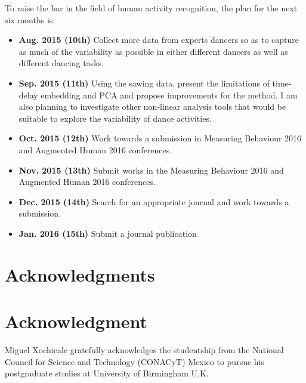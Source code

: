 \documentclass[10pt,journal,compsoc]{IEEEtran}
\begin{document}
To raise the bar in the field of human activity recognition,
the plan for the next six months is:
\begin{itemize}
\item \textbf{Aug. 2015 (10th)} Collect more data from experts 
  dancers so as to capture as much of the variability 
  as possible in either different dancers as well as 
  different dancing tasks.
\item \textbf{Sep. 2015 (11th)} Using the sawing data, present 
  the limitations of time-delay embedding and PCA 
  and propose improvements for the method. I am 
  also planning to investigate other non-linear analysis 
  tools that would be suitable to explore the variability 
  of dance activities.
\item \textbf{Oct. 2015 (12th)} Work towards a submission in 
  Measuring Behaviour 2016 and Augmented Human 
  2016 conferences.
\item \textbf{Nov. 2015 (13th)} Submit works in the Measuring 
  Behaviour 2016 and Augmented Human 2016 
  conferences.
\item \textbf{Dec. 2015 (14th)} Search for an appropriate journal 
  and work towards a submission.
\item \textbf{Jan. 2016 (15th)} Submit a journal publication
\end{itemize}







\ifCLASSOPTIONcompsoc
  \section*{Acknowledgments}
\else
  \section*{Acknowledgment}
\fi

Miguel Xochicale gratefully acknowledges the studentship from 
the National Council for Science and Technology (CONACyT) Mexico
to pursue his postgraduate studies at University of Birmingham U.K.

\ifCLASSOPTIONcaptionsoff
  \newpage
\fi



\end{document}
